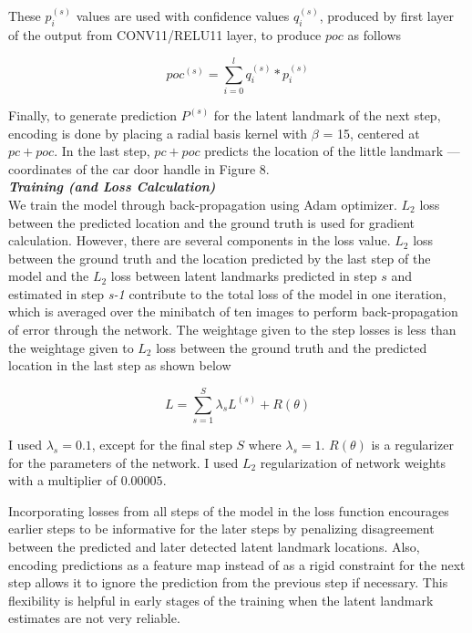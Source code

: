 \documentclass [11pt,letterpaper ,twoside ,openany ]{report}
\begin{document}
    \noindent
    These \( p_i^{(s)} \) values are used with confidence values \(q_i^{(s)} \), produced by first layer of the output from CONV11/RELU11 layer, to produce \( poc \) as follows

    \[      poc^{(s)} = \displaystyle\sum_{i=0}^{l} q_i^{(s)} * p_i^{(s)} \]

    \noindent
    Finally, to generate prediction \(P^{(s)} \) for the latent landmark of the next step, encoding is done by placing a radial basis kernel with \(\beta \) = 15, centered at \( pc + poc \). In the last step, \( pc  + poc \) predicts the location of the little landmark --- coordinates of the car door handle in Figure 8.\\

    \noindent
    \textbf{\textit{Training (and Loss Calculation)}}\\
    We train the model through back-propagation using Adam optimizer. \(L_2\) loss between the predicted location and the ground truth is used for gradient calculation. However, there are several components in the loss value. \(L_2\) loss between the ground truth and the location predicted by the last step of the model and the \(L_2\) loss between latent landmarks predicted in step \(s\) and estimated in step \textit {s-1} contribute to the total loss of the model in one iteration, which is averaged over the minibatch of ten images to perform back-propagation of error through the network. The weightage given to the step losses is less than the weightage given to \(L_2\) loss between the ground truth and the predicted location in the last step as shown below

    \[ L =  \displaystyle\sum_{s=1}^{S} \lambda _s L^{(s)} + R(\theta)\]

    \noindent
    I used \( \lambda _s = 0.1 \), except for the final step \(S\) where \( \lambda _s = 1\).  \( R(\theta) \) is a regularizer for the parameters of the network. I used \(L_2\) regularization of network weights with a multiplier of \(0.00005\). 
        
    Incorporating losses from all steps of the model in the loss function encourages earlier steps to be informative for the later steps by penalizing disagreement between the predicted and later detected latent landmark locations. Also, encoding predictions as a feature map instead of as a rigid constraint for the next step allows it to ignore the prediction from the previous step if necessary. This flexibility is helpful in early stages of the training when the latent landmark estimates are not very reliable.\\
\end{document}
